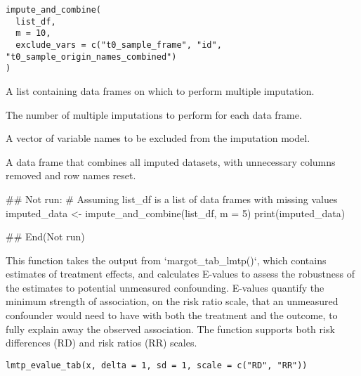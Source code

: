 \documentclass[a4paper]{book}
\begin{document}
%
\begin{Usage}
\begin{verbatim}
impute_and_combine(
  list_df,
  m = 10,
  exclude_vars = c("t0_sample_frame", "id", "t0_sample_origin_names_combined")
)
\end{verbatim}
\end{Usage}
%
\begin{Arguments}
\begin{ldescription}
\item[\code{list\_df}] A list containing data frames on which to perform multiple imputation.

\item[\code{m}] The number of multiple imputations to perform for each data frame.

\item[\code{exclude\_vars}] A vector of variable names to be excluded from the imputation model.
\end{ldescription}
\end{Arguments}
%
\begin{Value}
A data frame that combines all imputed datasets, with unnecessary columns removed
and row names reset.
\end{Value}
%
\begin{Examples}
\begin{ExampleCode}
## Not run: 
  # Assuming list_df is a list of data frames with missing values
  imputed_data <- impute_and_combine(list_df, m = 5)
  print(imputed_data)

## End(Not run)

\end{ExampleCode}
\end{Examples}
%
\begin{Description}
This function takes the output from `margot\_tab\_lmtp()`, which contains estimates of treatment effects,
and calculates E-values to assess the robustness of the estimates to potential unmeasured confounding.
E-values quantify the minimum strength of association, on the risk ratio scale, that an unmeasured
confounder would need to have with both the treatment and the outcome, to fully explain away the
observed association. The function supports both risk differences (RD) and risk ratios (RR) scales.
\end{Description}
%
\begin{Usage}
\begin{verbatim}
lmtp_evalue_tab(x, delta = 1, sd = 1, scale = c("RD", "RR"))
\end{verbatim}
\end{Usage}
\end{document}
